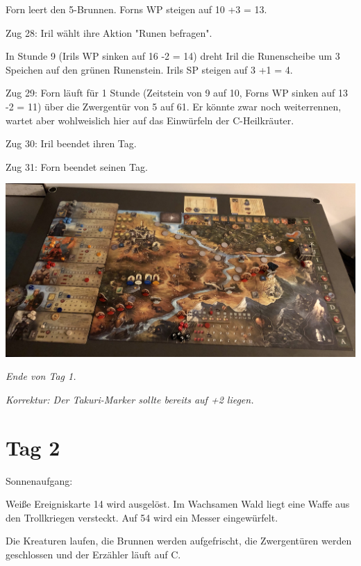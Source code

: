 \documentclass[10pt, a4paper, oneside]{book}
\begin{document}
{Forn leert den 5-Brunnen. Forns WP steigen auf 10 +3 = 13.



Zug 28: Iril wählt ihre Aktion "Runen befragen".

In Stunde 9 (Irils WP sinken auf 16 -2 = 14) dreht Iril die Runenscheibe um 3 Speichen auf den grünen Runenstein. Irils SP steigen auf 3 +1 = 4.



Zug 29: Forn läuft für 1 Stunde (Zeitstein von 9 auf 10, Forns WP sinken auf 13 -2 = 11) über die Zwergentür von 5 auf 61. Er könnte zwar noch weiterrennen, wartet aber wohlweislich hier auf das Einwürfeln der C-Heilkräuter.



Zug 30: Iril beendet ihren Tag.



Zug 31: Forn beendet seinen Tag.\bigskip






\includegraphics[width=\textwidth]{Das Erbe des Wunderkindes/Bilder/Tag 1 Ende.jpg}



\textit{Ende von Tag 1.}

\textit{Korrektur: Der Takuri-Marker sollte bereits auf +2 liegen.}


\newpage
\section{Tag 2}


Sonnenaufgang:

Weiße Ereigniskarte 14 wird ausgelöst. Im Wachsamen Wald liegt eine Waffe aus den Trollkriegen versteckt. Auf 54 wird ein Messer eingewürfelt.

Die Kreaturen laufen, die Brunnen werden aufgefrischt, die Zwergentüren werden geschlossen und der Erzähler läuft auf C.

}
\end{document}
